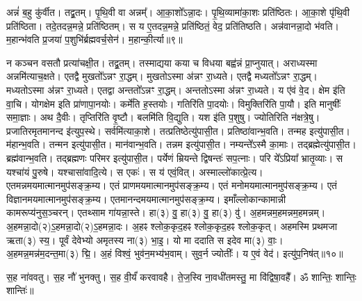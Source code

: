 अन्नं॑ ब॒हु कु॑र्वीत। 
तद्व्र॒तम्। 
पृ॒थि॒वी वा अन्नम्᳚। 
आ॒का॒शो᳚ऽन्ना॒दः। 
पृ॒थि॒व्यामा॑का॒शः प्रति॑ष्ठितः। 
आ॒का॒शे पृ॑थि॒वी प्रति॑ष्ठिता। 
तदे॒तदन्न॒मन्ने॒ प्रति॑ष्ठितम्। 
स य ए॒तदन्न॒मन्ने॒ प्रति॑ष्ठितं॒ वेद॒ प्रति॑तिष्ठति। 
अन्न॑वानन्ना॒दो भ॑वति। 
म॒हान्भ॑वति प्र॒जया॑ प॒शुभि॑र्ब्रह्मवर्च॒सेन॑। 
म॒हान्की॒र्त्या॥९॥

न कञ्चन वसतौ प्रत्या॑चक्षी॒त। 
तद्व्र॒तम्। 
तस्माद्यया कया च विधया बह्व॑न्नं प्रा॒प्नुयात्। 
अराध्यस्मा अन्नमि॑त्याच॒क्षते। 
एतद्वै मुखतो᳚ऽन्नꣳ रा॒द्धम्। 
मुखतोऽस्मा अ॑न्नꣳ रा॒ध्यते। 
एतद्वै मध्यतो᳚ऽन्नꣳ रा॒द्धम्। 
मध्यतोऽस्मा अ॑न्नꣳ रा॒ध्यते। 
एतद्वा अन्ततो᳚ऽन्नꣳ रा॒द्धम्। 
अन्ततोऽस्मा अ॑न्नꣳ रा॒ध्यते। 
य ए॑वं वे॒द। 
क्षेम इ॑ति वा॒चि। 
योगक्षेम इति प्रा॑णापा॒नयोः। 
कर्मे॑ति ह॒स्तयोः। 
गतिरि॑ति पा॒दयोः। 
विमुक्तिरि॑ति पा॒यौ। 
इति मानुषीः᳚ समा॒ज्ञाः। 
अथ दै॒वीः। 
तृप्तिरि॑ति वृ॒ष्टौ। 
बलमि॑ति वि॒द्युति। 
यश इ॑ति प॒शुषु। 
ज्योतिरिति न॑क्षत्रे॒षु। 
प्रजातिरमृतमानन्द इ॑त्युप॒स्थे। 
सर्वमि॑त्याका॒शे। 
तत्प्रतिष्ठेत्यु॑पासी॒त। 
प्रतिष्ठा॑वान्भ॒वति। 
तन्मह इत्यु॑पासी॒त। 
म॑हान्भ॒वति। 
तन्मन इत्यु॑पासी॒त। 
मान॑वान्भ॒वति। 
तन्नम इत्यु॑पासी॒त। 
नम्यन्ते᳚ऽस्मै का॒माः। 
तद्ब्रह्मेत्यु॑पासी॒त। 
ब्रह्म॑वान्भ॒वति। 
तद्ब्रह्मणः परिमर इत्यु॑पासी॒त। 
पर्येणं म्रियन्ते द्विषन्तः॑ सप॒त्नाः। 
परि ये᳚ऽप्रिया᳚ भ्रातृ॒व्याः। 
स यश्चा॑यं पु॒रुषे। 
यश्चासा॑वादि॒त्ये। 
स एकः॑। 
स य॑ एवं॒वित्। 
अस्माल्लो॑कात्प्रे॒त्य। 
एतमन्नमयमात्मानमुप॑सङ्क्र॒म्य। 
एतं प्राणमयमात्मानमुप॑सङ्क्र॒म्य। 
एतं मनोमयमात्मानमुप॑\-सङ्क्र॒म्य। 
एतं विज्ञानमयमात्मानमुप॑\-सङ्क्र॒म्य। 
एतमानन्दमय\-मात्मानमुप॑सङ्क्र॒म्य। 
इमाँल्लोकान्कामान्नी कामरूप्य॑नु\-स॒ञ्चरन्। 
एतथ्साम गा॑यन्ना॒स्ते। 
हा(३) वु॒ हा(३) वु॒ हा(३) वु॑। 
अ॒हमन्नम॒हमन्नम॒हमन्नम्। 
अ॒हमन्ना॒दो(२)\-ऽ॒हमन्ना॒दो(२)\-ऽ॒हमन्ना॒दः। 
अ॒हꣴ श्लोक॒कृद॒हꣴ श्लोक॒कृद॒हꣴ श्लोक॒कृत्। 
अहमस्मि प्रथमजा ऋता(३) स्य॒। 
पूर्वं देवेभ्यो अमृतस्य ना(३) भा॒इ॒। 
यो मा ददाति स इदेव मा(३) वाः॒। 
अ॒हमन्न॒मन्न॑म॒दन्त॒मा(३) द्मि॒। 
अ॒हं विश्वं॒ भुव॑न॒मभ्य॑भ॒वाम्। 
सुव॒र्न ज्योतीः᳚। 
य ए॒वं वेद॑। 
इत्यु॑प॒निष॑त्॥१०॥

स॒ह ना॑ववतु। 
स॒ह नौ॑ भुनक्तु। 
स॒ह वी॒र्यं॑ करवावहै। 
ते॒ज॒स्वि ना॒वधी॑तमस्तु॒ मा वि॑द्विषा॒वहै᳚। 
ॐ शान्तिः॒ शान्तिः॒ शान्तिः॑॥

\closesection


